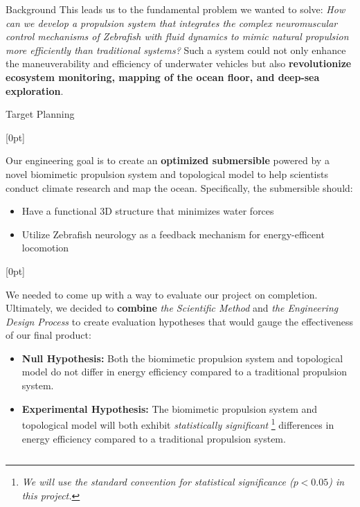 \documentclass[final, 16pt]{beamer}
\newlength{\colwidth}
\begin{document}
\begin{frame}[t]
\begin{columns}[t]
\begin{column}{\colwidth}
\begin{block}{Background}
    This leads us to the fundamental problem we wanted to solve: \emph{How can we develop a propulsion system that integrates the complex neuromuscular control mechanisms of Zebrafish with fluid dynamics to mimic natural propulsion more efficiently than traditional systems?} Such a system could not only enhance the maneuverability and efficiency of underwater vehicles but also \textbf{revolutionize ecosystem monitoring, mapping of the ocean floor, and deep-sea exploration}. 

  \end{block}

  \begin{block}{Target Planning}

    [0pt]

    \vspace{0.5cm}

    Our engineering goal is to create an \textbf{optimized submersible} powered by a novel biomimetic propulsion system and topological model to help scientists conduct climate research and map the ocean. Specifically, the submersible should:

    \begin{itemize}
      \item Have a functional 3D structure that minimizes water forces
      \item Utilize Zebrafish neurology as a feedback mechanism for energy-efficent locomotion
    \end{itemize}

    [0pt]

    \vspace{0.5cm}
    
    We needed to come up with a way to evaluate our project on completion. Ultimately, we decided to \textbf{combine} \emph{the Scientific Method} and \emph{the Engineering Design Process} to create evaluation hypotheses that would gauge the effectiveness of our final product:

    \begin{itemize}
    \item \textbf{Null Hypothesis:} Both the biomimetic propulsion system and topological model do not differ in energy efficiency compared to a traditional propulsion system.
    \item \textbf{Experimental Hypothesis:} The biomimetic propulsion system and topological model will both exhibit \emph{statistically significant} \footnote{ \emph{We will use the standard convention for statistical significance ($p < 0.05$) in this project.}} differences in energy efficiency compared to a traditional propulsion system.
    \end{itemize}


\end{block}
\end{column}
\end{columns}
\end{frame}
\end{document}
